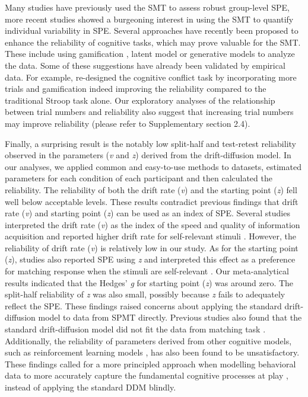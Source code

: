 \documentclass[sn-apa]{sn-jnl}%
\theoremstyle{thmstyleone}%
\theoremstyle{thmstyletwo}%
\theoremstyle{thmstylethree}%
\begin{document}
Many studies have previously used the SMT to assess robust group-level SPE, more recent studies showed a burgeoning interest in using the SMT to quantify individual variability in SPE. Several approaches have recently been proposed to enhance the reliability of cognitive tasks, which may prove valuable for the SMT. These include using gamification \parencite{friehs2020effective}, latent model \parencite{enkavi2019large, eisenberg2019uncovering} or generative models \parencite{haines2020theoretically} to analyze the data. Some of these suggestions have already been validated by empirical data. For example, \textcite{kucina2023calibration} re-designed the cognitive conflict task by incorporating more trials and gamification indeed improving the reliability compared to the traditional Stroop task alone. Our exploratory analyses of the relationship between trial numbers and reliability also suggest that increasing trial numbers may improve reliability (please refer to Supplementary section 2.4). 

Finally, a surprising result is the notably low split-half and test-retest reliability observed in the parameters (\textit{v} and \textit{z}) derived from the drift-diffusion model. In our analyses, we applied common and easy-to-use methods to datasets, estimated parameters for each condition of each participant and then calculated the reliability. The reliability of both the drift rate (\textit{v}) and the starting point (\textit{z}) fell well below acceptable levels. These results contradict previous findings that drift rate (\textit{v}) and starting point (\textit{z}) can be used as an index of SPE. Several studies interpreted the drift rate (\textit{v}) as the index of the speed and quality of information acquisition and reported higher drift rate for self-relevant stimuli \parencite[e.g.,][]{golubickis2017self,golubickis2020parts}. However, the reliability of drift rate (\textit{v}) is relatively low in our study. As for the starting point (\textit{z}), studies also reported SPE using \textit{z} and interpreted this effect as a preference for matching response when the stimuli are self-relevant \parencite[e.g.,][]{macrae2017self,reuther2017does}. Our meta-analytical results indicated that the Hedges' \textit{g }for starting point (\textit{z}) was around zero. The split-half reliability of \textit{z} was also small, possibly because \textit{z} fails to adequately reflect the SPE. These findings raised concerns about applying the standard drift-diffusion model to data from SPMT directly. Previous studies also found that the standard drift-diffusion model did not fit the data from matching task \parencite{groulx2020ez}. Additionally, the reliability of parameters derived from other cognitive models, such as reinforcement learning models \parencite{eckstein2022interpretation}, has also been found to be unsatisfactory. These findings called for a more principled approach when modelling behavioral data to more accurately capture the fundamental cognitive processes at play \parencite[e.g.,][]{wilson2019ten}, instead of applying the standard DDM blindly.  
\end{document}
